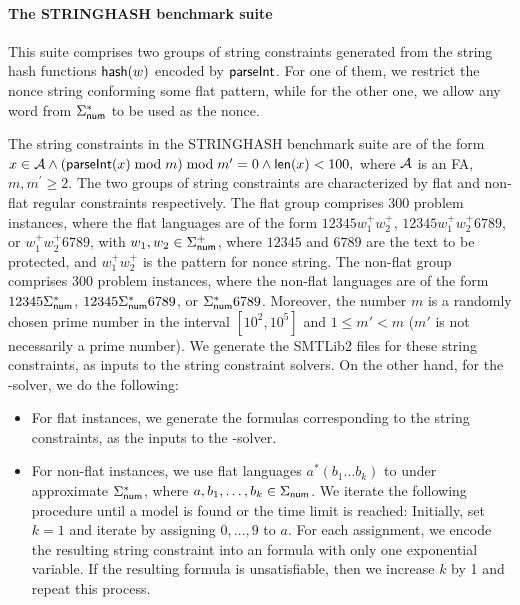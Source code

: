 \paragraph{The STRINGHASH benchmark suite} 
This suite comprises two groups of string constraints generated from the string hash functions ${\sf hash}(w)$ encoded by $\textsf{parseInt}$.
For one of them, we restrict the nonce string conforming some flat pattern, while for the other one, we allow any word from $\Sigma^*_{\sf num}$ to be used as the nonce.

The string constraints in the STRINGHASH benchmark suite are of the form 
%
$x \in \mathcal{A} \wedge \left( \textsf{parseInt}(x) \bmod m \right) \bmod m^\prime = 0   \notag \wedge \textsf{len}(x) < 100,$ 
%
where $\mathcal{A}$ is an FA, $m, m^\prime \ge 2.$ 
The two groups of string constraints are characterized by flat and non-flat regular constraints respectively.
The flat group comprises 300 problem instances, where the flat languages are of the form $12345w^+_1 w^+_2$,  $12345 w^+_1  w^+_2 6789$, or $w^+_1 w^+_2 6789$, with $w_1,w_2 \in \Sigma^+_{\sf num}$, where $12345$ and $6789$ are the text to be protected, and $w^+_1 w^+_2$ is the pattern for nonce string. The non-flat group comprises 300 problem instances, where the non-flat languages are of the form $12345\Sigma_{\sf num}^*$, $12345\Sigma_{\sf num}^* 6789$, or $\Sigma_{\sf num}^* 6789$. Moreover, the number $m$ is a randomly chosen prime number in the interval $[10^2, 10^5]$ and $1 \le m' < m$ ($m'$ is not necessarily a prime number). We generate the SMTLib2 files for these string constraints, as inputs to the string constraint solvers. On the other hand, for the {\paexp}-solver, we do the following:   
\begin{itemize}
\item For flat instances, we generate the {\paexp} formulas corresponding to the string constraints, as the inputs to the {\paexp}-solver.
%
\item For non-flat instances, we use flat languages $a^* (b_{1} \ldots b_{k})$ to under approximate 
$\Sigma_{\sf num}^*$,  where $a, b_1,\ldots, b_k \in \Sigma_{\sf num}$. 
%
%
We iterate the following procedure until a model is found or the time limit is reached: Initially, set $k=1$ and iterate by assigning $0, \ldots, 9$ to $a$. For each assignment, we encode the resulting string constraint into an {\paexp} formula with only one exponential variable. If the resulting {\paexp} formula is unsatisfiable, then we increase $k$ by 1 and repeat this process. 
\end{itemize}
